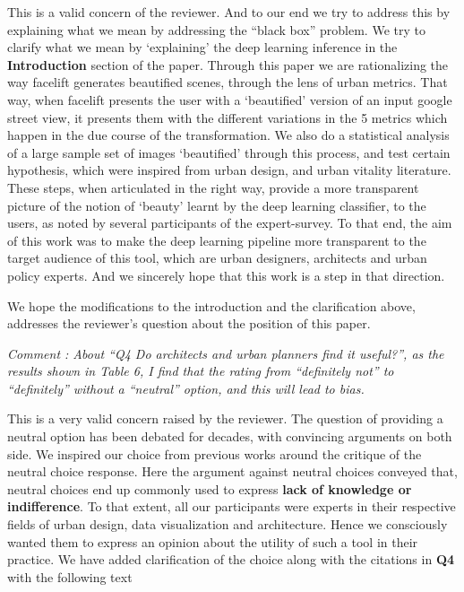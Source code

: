 \documentclass{paper}
\newenvironment{myquote}
{\definecolor{shadecolor}{rgb}{0.9,0.95,1} \begin{shaded*} \sf \em}
{\em\end{shaded*}}
\begin{document}
\noindent %
This is a valid concern of the reviewer. And to our end we try to address this by explaining what we mean by addressing the ``black box'' problem. We try to clarify what we mean by `explaining' the deep learning inference in the \textbf{Introduction} section of the paper. Through this paper we are rationalizing the way facelift generates beautified scenes, through the lens of urban metrics. That way, when facelift presents the user with a `beautified' version of an input google street view, it presents them with the different variations in the 5 metrics which happen in the due course of the transformation. We also do a statistical analysis of a large sample set of images `beautified' through this process, and test certain hypothesis, which were inspired from urban design, and urban vitality literature. These steps, when articulated in the right way, provide a more transparent picture of the notion of `beauty' learnt by the deep learning classifier, to the users, as noted by several participants of the expert-survey. To that end, the aim of this work was to make the deep learning pipeline more transparent to the target audience of this tool, which are urban designers, architects and urban policy experts. And we sincerely hope that this work is a step in that direction.

We hope the modifications to the introduction and the clarification above, addresses the reviewer's question about the position of this paper.

\begin{myquote}
\noindent Comment : About “Q4 Do architects and urban planners find it useful?”, as the results shown in Table 6, I find that the rating from “definitely not” to “definitely” without a “neutral” option, and this will lead to bias.
\end{myquote}
\noindent %

This is a very valid concern raised by the reviewer. The question of providing a neutral option has been debated for decades, with convincing arguments on both side. We inspired our choice from previous works\cite{moors2008exploring}\cite{Agree2012} around the critique of the neutral choice response. Here the argument against neutral choices conveyed that, neutral choices end up commonly used to express \textbf{lack of knowledge or indifference}. To that extent, all our participants were experts in their respective fields of urban design, data visualization and architecture. Hence we consciously wanted them to express an opinion about the utility of such a tool in their practice. We have added clarification of the choice along with the citations in \textbf{Q4} with the following text 
\end{document}
